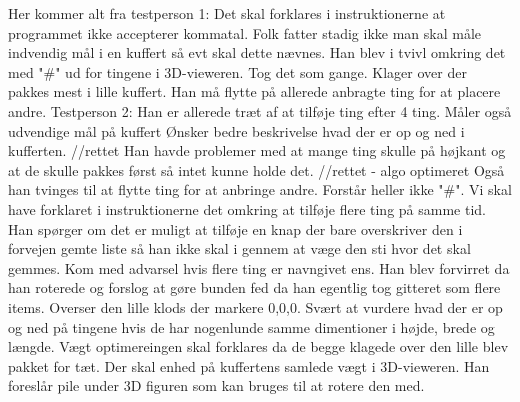 Her kommer alt fra testperson 1:
Det skal forklares i instruktionerne at programmet ikke accepterer kommatal. 
Folk fatter stadig ikke man skal måle indvendig mål i en kuffert så evt skal dette nævnes.
Han blev i tvivl omkring det med "#" ud for tingene i 3D-vieweren. Tog det som gange.
Klager over der pakkes mest i lille kuffert.
Han må flytte på allerede anbragte ting for at placere andre.
Testperson 2:
Han er allerede træt af at tilføje ting efter 4 ting.
Måler også udvendige mål på kuffert
Ønsker bedre beskrivelse hvad der er op og ned i kufferten. //rettet
Han havde problemer med at mange ting skulle på højkant og at de skulle pakkes først så intet kunne holde det. //rettet - algo optimeret
Også han tvinges til at flytte ting for at anbringe andre.
Forstår heller ikke "#".
Vi skal have forklaret i instruktionerne det omkring at tilføje flere ting på samme tid.
Han spørger om det er muligt at tilføje en knap der bare overskriver den i forvejen gemte liste så han ikke skal i gennem at væge den sti hvor det skal gemmes.
Kom med advarsel hvis flere ting er navngivet ens.
Han blev forvirret da han roterede og forslog at gøre bunden fed da han egentlig tog gitteret som flere items.
Overser den lille klods der markere 0,0,0.
Svært at vurdere hvad der er op og ned på tingene hvis de har nogenlunde samme dimentioner i højde, brede og længde.
Vægt optimereingen skal forklares da de begge klagede over den lille blev pakket for tæt.
Der skal enhed på kuffertens samlede vægt i 3D-vieweren.
Han foreslår pile under 3D figuren som kan bruges til at rotere den med.